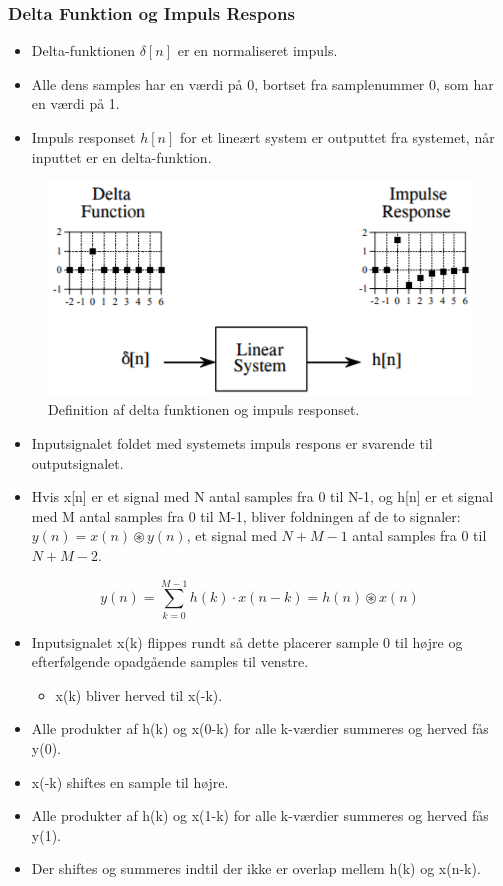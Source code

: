 \documentclass[danish]{article}
\begin{document}
\subsubsection{Delta Funktion og Impuls Respons}
\begin{itemize}
	\item Delta-funktionen $\delta[n]$ er en normaliseret impuls.
	\item Alle dens samples har en værdi på 0, bortset fra samplenummer 0, som har en værdi på 1.
	\item Impuls responset $h[n]$ for et lineært system er outputtet fra systemet, når inputtet er en delta-funktion.
\end{itemize}

\begin{figure} [H]
	\centering
	\includegraphics[width=0.6\linewidth]{graphics/deltafunction_impulseresponse}
	\caption{Definition af delta funktionen og impuls responset.}
	\label{fig:deltafunction_impulseresponse}
\end{figure}

\begin{itemize}
	\item Inputsignalet foldet med systemets impuls respons er svarende til outputsignalet.
	\item Hvis x[n] er et signal med N antal samples fra 0
	til N-1, og h[n] er et signal med M antal samples fra 0 til M-1, bliver foldningen af de to signaler:  $y(n) = x(n) \circledast y(n)$, et signal med $N+M-1$ antal samples fra 0 til $N+M-2$.
\end{itemize}

\begin{equation}
y(n) = \sum_{k=0}^{M-1} h(k) \cdot x(n-k) = h(n) \circledast x(n)
\end{equation}

\begin{itemize}
	\item Inputsignalet x(k) flippes rundt så dette placerer
	sample 0 til højre og efterfølgende opadgående samples til venstre.
	\begin{itemize}
		\item x(k) bliver herved til x(-k).
	\end{itemize}
	\item Alle produkter af h(k) og x(0-k) for alle k-værdier summeres og herved fås y(0).
	\item x(-k) shiftes en sample til højre.
	\item  Alle produkter af h(k) og x(1-k) for alle k-værdier summeres og herved fås y(1).
	\item Der shiftes og summeres indtil der ikke er overlap mellem h(k) og x(n-k).
\end{itemize}
\end{document}
